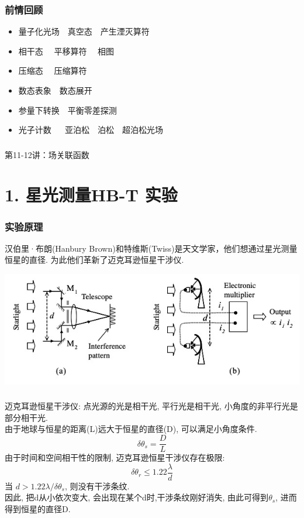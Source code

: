 \begin{frame}
    \frametitle{前情回顾}
    \begin{itemize}
        \item 量子化光场~~真空态~~产生湮灭算符 
        \item 相干态~~ 平移算符 ~~相图
        \item 压缩态~~ 压缩算符
        \item 数态表象~~数态展开
        \item 参量下转换~~平衡零差探测 
        \item 光子计数 ~~ 亚泊松~~泊松~~超泊松光场 
    \end{itemize}     
\end{frame}

\begin{frame} [plain]
    \frametitle{}
    \Background[1] 
    \begin{center}
    {\huge 第11-12讲：场关联函数}
    \end{center}  
    \addtocounter{framenumber}{-1}   
\end{frame}

\section{1. 星光测量HB-T 实验}

\begin{frame} 
 \frametitle{实验原理}
 汉伯里·布朗(Hanbury Brown)和特维斯(Twiss)是天文学家，他们想通过星光测量恒星的直径.
 为此他们革新了迈克耳逊恒星干涉仪.
   \begin{center}
        \includegraphics[width=1.0\textwidth]{figs/2022-05-08-12-30-39.png}
   \end{center}
\end{frame}

\begin{frame}
 \frametitle{}
 迈克耳逊恒星干涉仪: 点光源的光是相干光, 平行光是相干光, 小角度的非平行光是部分相干光. \\ 
 由于地球与恒星的距离(L)远大于恒星的直径(D), 可以满足小角度条件.
 \[ \delta \theta_s =\frac{D}{L}\] 
 由于时间和空间相干性的限制, 迈克耳逊恒星干涉仪存在极限:
 \[ \delta \theta_r\leq 1.22 \frac{\lambda}{d}\] 
 当 $d> 1.22 \lambda /\delta \theta_s$, 则没有干涉条纹.  \\ 
 因此, 把d从小依次变大, 会出现在某个d时,干涉条纹刚好消失, 由此可得到$\theta_s$, 进而得到恒星的直径D. 
\end{frame}

